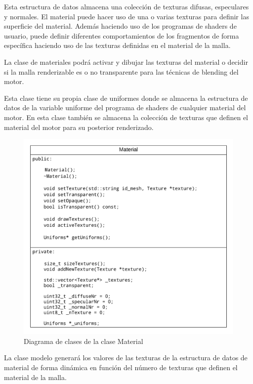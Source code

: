 \documentclass[a4paper, 17pt]{book}
\begin{document}
Esta estructura de datos almacena una colección de texturas difusas, especulares y normales. El material puede hacer uso de una o
varias texturas para definir las superficie del material. Además haciendo uso de los programas de shaders de usuario, puede definir
diferentes comportamientos de los fragmentos de forma específica haciendo uso de las texturas definidas en el material de la malla.

La clase de materiales podrá activar y dibujar las texturas del material o decidir si la malla renderizable es o no transparente para
las técnicas de blending del motor. 

Esta clase tiene su propia clase de uniformes donde se almacena la estructura de datos de la variable uniforme del programa de shaders
de cualquier material del motor. En esta clase también se almacena la colección de texturas que definen el material del motor para
su posterior renderizado.

\begin{figure}[hbt!]
    \centering
    \includegraphics[scale=0.5, keepaspectratio]{img/material_class.png}
    \caption{Diagrama de clases de la clase Material}
    \label{figura:material_class}
\end{figure}

La clase modelo generará los valores de las texturas de la estructura de datos de material de forma dinámica en función del número de
texturas que definen el material de la malla.
\end{document}
